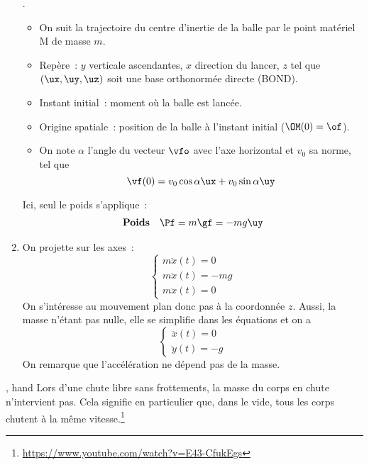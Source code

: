 \documentclass[../main/main.tex]{subfiles}
\begin{document}
\begin{enumerate}[label=\sqenumi, start=3]
    .
        \begin{itemize}
            \item On suit la trajectoire du centre d'inertie de la balle par le
                point matériel M de masse $m$.
            \item Repère~: $y$ verticale ascendantes, $x$ direction du lancer,
                $z$ tel que $(\ux, \uy, \uz)$ soit une base orthonormée directe
                (BOND).
            \item Instant initial~: moment où la balle est lancée.
            \item Origine spatiale~: position de la balle à l'instant initial
                ($\OM(0) = \of$).
            \item On note $\alpha$ l'angle du vecteur $\vfo$ avec l'axe
                horizontal et $v_0$ sa norme, tel que
                \[\vf(0) = v_0\cos\alpha\ux + v_0\sin\alpha\uy\]
        \end{itemize}
     Ici, seul le poids s'applique~:
        \[
            \begin{array}{ll}
                \textbf{Poids} & \Pf = m\gf = -mg\uy
            \end{array}
        \]
    \item {}
     On projette sur les axes~:
        \[
            \left\{
                \begin{array}{l}
                    m\ddot{x}(t) = 0\\
                    m\ddot{x}(t) = -mg\\
                    m\ddot{x}(t) = 0
                \end{array}
            \right.
        \]
        On s'intéresse au mouvement plan donc pas à la coordonnée $z$. Aussi, la
        masse n'étant pas nulle, elle se simplifie dans les équations et on a
        \[
            \left\{ 
                \begin{array}{l}
                    \ddot{x}(t) = 0\\
                    \ddot{y}(t) = -g
                \end{array}
            \right.
        \]
        On remarque que l'accélération ne dépend pas de la masse.
\end{enumerate}
\begin{tror}{, hand}
    Lors d’une chute libre sans frottements, la masse du corps en chute
    n’intervient pas. Cela signifie en particulier que, dans le vide, tous les
    corps chutent à la même
    vitesse.\footnote{\url{https://www.youtube.com/watch?v=E43-CfukEgs}}
\end{tror}
\end{document}
